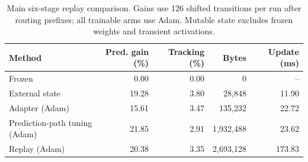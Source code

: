 \begin{table}[tbp]
\centering\small
\caption{Main six-stage replay comparison. Gains use 126 shifted transitions per run after routing prefixes; all trainable arms use Adam. Mutable state excludes frozen weights and transient activations.}
\label{tab:main}
\begin{tabular}{@{}lrrrr@{}}
\toprule
Method & Pred. gain (\%) & Tracking (\%) & Bytes & Update (ms) \\
\midrule
Frozen & 0.00 & 0.00 & 0 & -- \\
External state & 19.28 & 3.80 & 28,848 & 11.90 \\
Adapter (Adam) & 15.61 & 3.47 & 135,232 & 22.72 \\
Prediction-path tuning (Adam) & 21.85 & 2.91 & 1,932,488 & 23.62 \\
Replay (Adam) & 20.38 & 3.35 & 2,693,128 & 173.83 \\
\bottomrule
\end{tabular}
\end{table}
